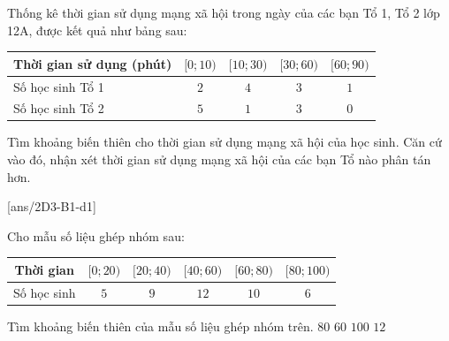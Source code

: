 \begin{vd}
	Thống kê thời gian sử dụng mạng xã hội trong ngày của các bạn Tổ 1, Tổ 2 lớp 12A, được kết quả như bảng sau:
	\begin{center}
		\begin{tabular}{|l|c|c|c|c|}
			\hline Thời gian sử dụng (phút) &{$[0; 10)$} &{$[10; 30)$} &{$[30; 60)$} &{$[60; 90)$} \\
			\hline Số học sinh Tổ 1 & $ 2 $ & $ 4 $ & $ 3 $ & $ 1 $ \\
			\hline Số học sinh Tổ 2 & $ 5 $ & $ 1 $ & $ 3 $ & $ 0 $ \\
			\hline
		\end{tabular}
	\end{center}
	Tìm khoảng biến thiên cho thời gian sử dụng mạng xã hội của học sinh. Căn cứ vào đó, nhận xét thời gian sử dụng mạng xã hội của các bạn Tổ nào phân tán hơn.
\end{vd}
[ans/2D3-B1-d1]
\begin{ex}
	Cho mẫu số liệu ghép nhóm sau:
	\vspace*{-10pt}
	\begin{center}
		\begin{tabular}{|c|c|c|c|c|c|}
			\hline Thời gian & {$[0 ; 20)$} & {$[20 ; 40)$} & {$[40 ; 60)$} & {$[60 ; 80)$} &  {$[80 ;100)$} \\
			\hline Số học sinh & $5$ & $9$ & $12$ & $10$ & $6$  \\
			\hline
		\end{tabular}
	\end{center}
	Tìm khoảng biến thiên của mẫu số liệu ghép nhóm trên.
	\choice
	{$80$}
	{$60$}
	{\True $100$}
	{$12$}
\end{ex}
